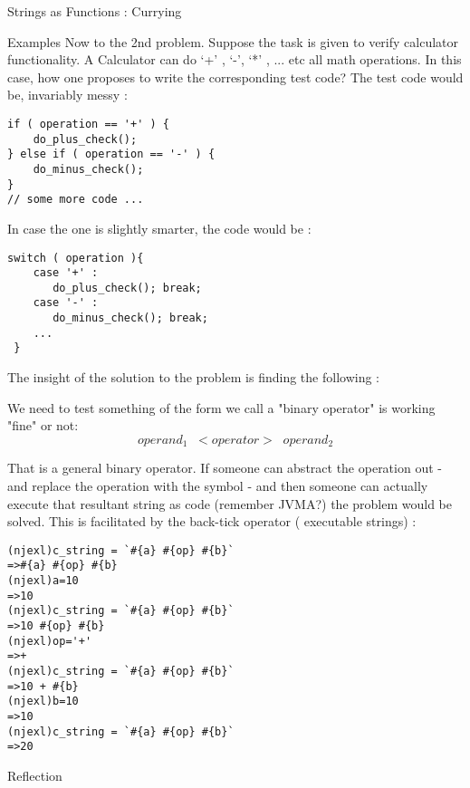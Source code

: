 \begin{section}{Strings as Functions : Currying}
\begin{subsection}{Examples}
Now to the 2nd problem.
Suppose the task is given to verify calculator functionality. 
A Calculator can do `+' , `-', `*' , ... etc all math operations. 
In this case, how one proposes to write the corresponding test code?
The test code would be, invariably messy :

\begin{lstlisting}[style=JexlStyle]
if ( operation == '+' ) {
    do_plus_check();
} else if ( operation == '-' ) {
    do_minus_check();
}
// some more code ...
\end{lstlisting}

In case the one is slightly smarter, the code would be :

\begin{center}\begin{minipage}{\linewidth}
\begin{lstlisting}[style=JexlStyle]
switch ( operation ){
    case '+' :
       do_plus_check(); break;
    case '-' :
       do_minus_check(); break;
    ...
 }
\end{lstlisting} 
\end{minipage}\end{center}

The insight of the solution to the problem is finding the following :

\begin{center}
We need to test something of the form we call a "binary operator" is working "fine" or not:
$$
operand_1 \; \;  <operator> \; \;  operand_2 
$$
\end{center}

That is a general binary operator. If someone can abstract the operation out - and replace the operation with the symbol - 
and then someone can actually execute that resultant string as code (remember JVMA?) the problem would be solved.
This is facilitated by the back-tick operator ( executable strings) :

\begin{lstlisting}[style=all]
(njexl)c_string = `#{a} #{op} #{b}`
=>#{a} #{op} #{b}
(njexl)a=10
=>10
(njexl)c_string = `#{a} #{op} #{b}`
=>10 #{op} #{b}
(njexl)op='+'
=>+
(njexl)c_string = `#{a} #{op} #{b}`
=>10 + #{b}
(njexl)b=10
=>10
(njexl)c_string = `#{a} #{op} #{b}`
=>20
\end{lstlisting}
\end{subsection}

\begin{subsection}{Reflection}


\end{subsection}
\end{section}
